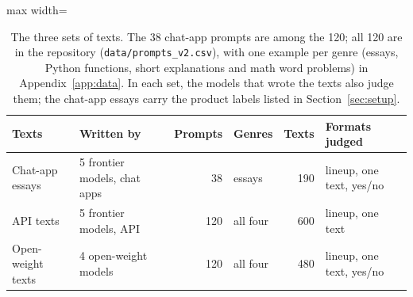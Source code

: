 \begin{table}[t]
\centering\small
\begin{adjustbox}{max width=\linewidth}
\begin{tabular}{l l r l r l}
\toprule
Texts & Written by & Prompts & Genres & Texts & Formats judged \\
\midrule
Chat-app essays & 5 frontier models, chat apps & 38 & essays & 190 & lineup, one text, yes/no \\
API texts & 5 frontier models, API & 120 & all four & 600 & lineup, one text \\
Open-weight texts & 4 open-weight models & 120 & all four & 480 & lineup, one text, yes/no \\
\bottomrule
\end{tabular}
\end{adjustbox}
\caption{The three sets of texts. The 38 chat-app prompts are among the 120;
all 120 are in the repository (\texttt{data/prompts\_v2.csv}), with one
example per genre (essays, Python functions, short explanations and math word
problems) in Appendix~\ref{app:data}. In each set, the models that wrote the texts also judge them; the chat-app essays carry the product labels listed in Section~\ref{sec:setup}.}
\label{tab:data}
\end{table}
